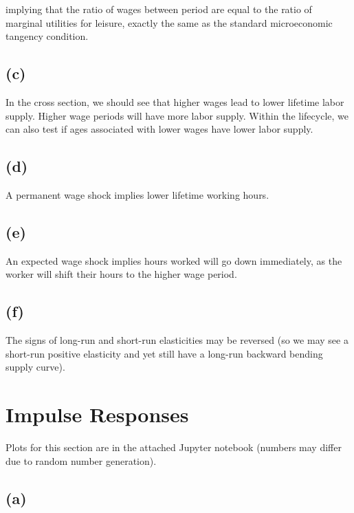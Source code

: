 \documentclass[11pt]{amsart}
\begin{document}
implying that the ratio of wages between period are equal to the ratio of marginal utilities for leisure, exactly the same as the standard microeconomic tangency condition.
    
\subsection*{(c)}
In the cross section, we should see that higher wages lead to lower lifetime labor supply. 
Higher wage periods will have more labor supply.
Within the lifecycle, we can also test if ages associated with lower wages have lower labor supply.

\subsection*{(d)}
A permanent wage shock implies lower lifetime working hours.

\subsection*{(e)}
An expected wage shock implies hours worked will go down immediately, as the worker will shift their hours to the higher wage period.

\subsection*{(f)}
The signs of long-run and short-run elasticities may be reversed (so we may see a short-run positive elasticity and yet still have a long-run backward bending supply curve).

\section{Impulse Responses}



Plots for this section are in the attached Jupyter notebook (numbers may differ due to random number generation).

\subsection*{(a)}
\end{document}

